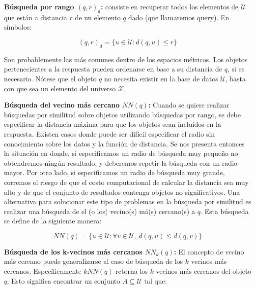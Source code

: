 \begin{description}
   \item {\textbf{B\'usqueda por rango $(q,r)_{d}$:}}
          consiste en recuperar todos los elementos  de $\mathcal{U}$
          que est\'an a distancia $r$ de un elemento $q$ dado (que llamaremos
          query).  En s\'imbolos:

           \vspace{-3mm}
          \[(q,r)_{d}=\{u \in \mathcal{U}:  d(q,u) \leq r\}\]
          
          Son probablemente las m\'as comunes dentro de los espacios
           m\'etricos.  Los objetos pertenecientes a la respuesta pueden 
           ordenarse en base a su distancia de $q$, si es necesario.
            N\'otese que el objeto $q$ no necesita existir en la base de datos $\mathcal{U}$,
            basta con que sea un elemento del universo $\mathcal{X}$, 

   \item{\textbf{ B\'usqueda del vecino m\'as cercano $NN(q)$:}}
         Cuando se quiere realizar b\'usquedas por similitud sobre objetos 
         utilizando b\'usquedas por rango, se debe especificar la distancia 
         m\'axima para que los objetos sean inclu\'idos en la respuesta. Existen 
         casos donde puede ser dif\'icil especificar el radio sin conocimiento
          sobre los datos y la funci\'on de distancia. 
          Se nos presenta entonces la situaci\'on en donde, si especificamos 
          un radio de b\'usqueda muy peque\~no no obtendremos ning\'un resultado, 
          y deberemos repetir la b\'usqueda con un radio mayor. 
          Por otro lado, si especificamos un radio de b\'usqueda 
          muy grande, corremos el riesgo de que el costo computacional de calcular 
          la distancia sea muy alto y de que el conjunto de resultados contenga 
          objetos no significativos. 
          Una alternativa para solucionar este tipo de problemas en la b\'usqueda por
           similitud es realizar una b\'usqueda de el (o los)  vecino(s) m\'a(s) cercano(s)
           a $q$. Esta b\'usqueda se define de la siguiente manera:

          \vspace{-3mm}
          \[ NN(q)=\{u \in \mathcal{U} : \forall v \in \mathcal{U},
          \ d(q,u) \leq d(q,v)\}\]
          

   \item {\textbf{ B\'usqueda de los k-vecinos m\'as cercanos $NN_{k}(q)$:}}
         El concepto de vecino m\'as cercano puede generalizarse al caso 
         de b\'usqueda de los $k$ vecinos m\'as cercanos. Espec\'ificamente
          $kNN(q)$ retorna los $k$ vecinos m\'as cercanos del objeto $q$, 
          Esto significa encontrar un conjunto
          $A \subseteq \mathcal{U} $ tal que:


\end{description}
